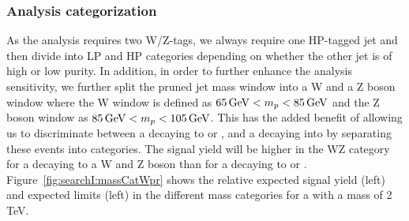 \subsubsection{Analysis categorization}
As the analysis requires two W/Z-tags, we always require one HP-tagged jet and then divide into LP and HP categories depending on whether the other jet is of high or low purity. In addition, in order to further enhance the analysis sensitivity, we further split the pruned jet mass window into a W and a Z boson window where the W window is defined as $65 {\,\text{Ge\hspace{-.08em}V}} < m_{p} < 85 {\,\text{Ge\hspace{-.08em}V}}$ and the Z boson window as $85 {\,\text{Ge\hspace{-.08em}V}} < m_{p} < 105 {\,\text{Ge\hspace{-.08em}V}}$. This has the added benefit of allowing us to discriminate between a \BulkG decaying to \WW or \ZZ, and a \PWpr decaying into \WZ by separating these events into categories. The signal yield will be higher in the WZ category for a \PWpr decaying to a W and Z boson than for a \BulkG decaying to \WW or \ZZ. Figure~\ref{fig:searchI:massCatWpr} shows the relative expected signal yield (left) and expected limits (left) in the different mass categories for a \PWpr with a mass of 2 TeV.
